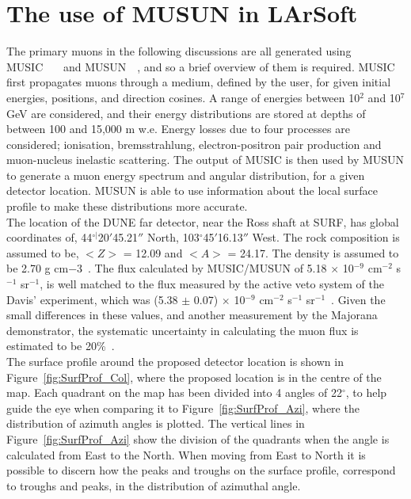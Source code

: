 \section{The use of MUSUN in LArSoft} \label{sec:FDIncorporation}  %
The primary muons in the following discussions are all generated using MUSIC~\citep{MUSUN}~\citep{MUSIC}~\citep{MUSIC2} and MUSUN~\citep{MUSUN}~\citep{MUSUN2}, and so a brief overview of them is required. MUSIC first propagates muons through a medium, defined by the user, for given initial energies, positions, and direction cosines. A range of energies between 10$^2$ and 10$^7$ GeV are considered, and their energy distributions are stored at depths of between 100 and 15,000 m w.e. Energy losses due to four processes are considered; ionisation, bremsstrahlung, electron-positron pair production and muon-nucleus inelastic scattering. The output of MUSIC is then used by MUSUN to generate a muon energy spectrum and angular distribution, for a given detector location. MUSUN is able to use information about the local surface profile to make these distributions more accurate. \\

The location of the DUNE far detector, near the Ross shaft at SURF, has global coordinates of, 44$^{\circ|}$20$'$45.21$''$ North, 103$^{\circ}$45$'$16.13$''$ West. The rock composition is assumed to be, $< Z >$ = 12.09 and $< A >$ = 24.17. The density is assumed to be 2.70 g cm${-3}$~\citep{Mei:2009py}. The flux calculated by MUSIC/MUSUN of 5.18 $\times$ 10$^{-9}$ cm$^{-2}$ s$^{-1}$ sr$^{-1}$, is well matched to the flux measured by the active veto system of the Davis' experiment, which was (5.38 $\pm$ 0.07) $\times$ 10$^{-9}$ cm$^{-2}$ s$^{-1}$ sr$^{-1}$~\citep{PhysRevD.27.1444}. Given the small differences in these values, and another measurement by the Majorana demonstrator, the systematic uncertainty in calculating the muon flux is estimated to be 20\%~\citep{NDKTFNote}. \\

The surface profile around the proposed detector location is shown in Figure~\ref{fig:SurfProf_Col}, where the proposed location is in the centre of the map. Each quadrant on the map has been divided into 4 angles of 22$^{\circ}$, to help guide the eye when comparing it to Figure~\ref{fig:SurfProf_Azi}, where the distribution of azimuth angles is plotted. The vertical lines in Figure~\ref{fig:SurfProf_Azi} show the division of the quadrants when the angle is calculated from East to the North. When moving from East to North it is possible to discern how the peaks and troughs on the surface profile, correspond to troughs and peaks, in the distribution of azimuthal angle. \\

